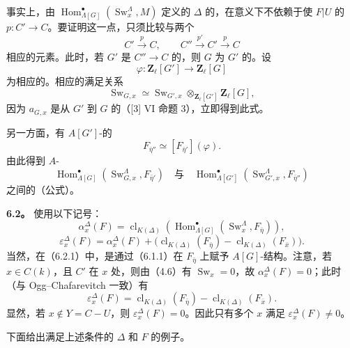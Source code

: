 事实上，由 $\operatorname{Hom}_{\Lambda[G]}^\bullet(\operatorname{Sw}_x^\Lambda,M)$ 定义的 $\Delta$ 的，在意义下不依赖于使 $F|U$ 的 $p:C'\longrightarrow C$。要证明这一点，只须比较与两个
\[
C'\xrightarrow{p}C,\qquad C''\xrightarrow{p'}C'\xrightarrow{p}C
\]
相应的元素。此时，若 $G'$ 是 $C''\longrightarrow C$ 的，则 $G$ 为 $G'$ 的。设
\[
\varphi:\mathbf Z_\ell[G']\longrightarrow\mathbf Z_\ell[G]
\]
为相应的。相应的满足关系
\[
\operatorname{Sw}_{G,x}\simeq
\operatorname{Sw}_{G',x}\otimes_{\mathbf Z_\ell[G']}\mathbf Z_\ell[G],
\]
因为 $a_{G,x}$ 是从 $G'$ 到 $G$ 的（[3] VI 命题 3），立即得到此式。

另一方面，有 $A[G']$-的
\[
F_{\bar\eta''}\simeq[F_{\bar\eta'}](\varphi).
\]
由此得到 $A$-
\[
\operatorname{Hom}_{\Lambda[G]}^\bullet(\operatorname{Sw}_{G,x}^\Lambda,F_{\bar\eta'})
\quad\text{与}\quad
\operatorname{Hom}_{\Lambda[G']}^\bullet(\operatorname{Sw}_{G',x}^\Lambda,F_{\bar\eta''})
\]
之间的（公式）。

\textbf{6.2。} 使用以下记号：
\[
\alpha_x^\Delta(F)=\operatorname{cl}_{K(\Delta)}
\left(\operatorname{Hom}_{\Lambda[G]}^\bullet(\operatorname{Sw}_x^\Lambda,F_{\bar\eta})\right),\tag{6.2.1}
\]
\[
\varepsilon_x^\Delta(F)=\alpha_x^\Delta(F)+
\bigl(\operatorname{cl}_{K(\Delta)}(F_{\bar\eta})-
\operatorname{cl}_{K(\Delta)}(F_{\bar x})\bigr).\tag{6.2.2}
\]
当然，在（6.2.1）中，是通过（6.1.1）在 $F_{\bar\eta}$ 上赋予 $A[G]$-结构。注意，若 $x\in C(k)$，且 $C'$ 在 $x$ 处，则由（4.6）有 $\operatorname{Sw}_x=0$，故 $\alpha_x^\Delta(F)=0$；此时（与 Ogg--Chafarevitch 一致）有
\[
\varepsilon_x^\Delta(F)=\operatorname{cl}_{K(\Delta)}(F_{\bar\eta})-
\operatorname{cl}_{K(\Delta)}(F_{\bar x}).\tag{6.2.3}
\]
显然，若 $x\notin Y=C-U$，则 $\varepsilon_x^\Delta(F)=0$。因此只有多个 $x$ 满足 $\varepsilon_x^\Delta(F)\ne0$。

下面给出满足上述条件的 $\Delta$ 和 $F$ 的例子。

